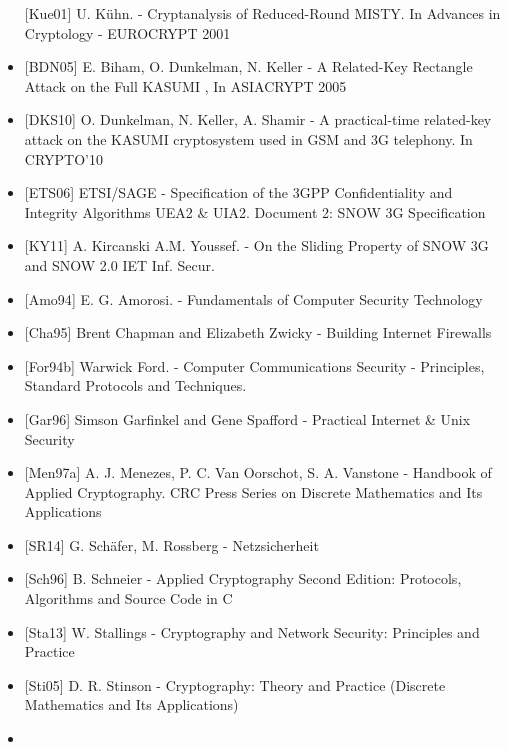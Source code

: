 \documentclass[a4paper]{article}
\begin{document}
\begin{multicols}{3}
\begin{itemize}
              {[}Kue01{]} U. Kühn. - Cryptanalysis of Reduced-Round MISTY. In
              Advances in Cryptology - EUROCRYPT 2001
        \item
              {[}BDN05{]} E. Biham, O. Dunkelman, N. Keller - A Related-Key
              Rectangle Attack on the Full KASUMI , In ASIACRYPT 2005
        \item
              {[}DKS10{]} O. Dunkelman, N. Keller, A. Shamir - A practical-time
              related-key attack on the KASUMI cryptosystem used in GSM and 3G
              telephony. In CRYPTO'10
        \item
              {[}ETS06{]} ETSI/SAGE - Specification of the 3GPP Confidentiality and
              Integrity Algorithms UEA2 \& UIA2. Document 2: SNOW 3G Specification
        \item
              {[}KY11{]} A. Kircanski A.M. Youssef. - On the Sliding Property of
              SNOW 3G and SNOW 2.0 IET Inf. Secur.
        \item
              {[}Amo94{]} E. G. Amorosi. - Fundamentals of Computer Security
              Technology
        \item
              {[}Cha95{]} Brent Chapman and Elizabeth Zwicky - Building Internet
              Firewalls
        \item
              {[}For94b{]} Warwick Ford. - Computer Communications Security -
              Principles, Standard Protocols and Techniques.
        \item
              {[}Gar96{]} Simson Garfinkel and Gene Spafford - Practical Internet \&
              Unix Security
        \item
              {[}Men97a{]} A. J. Menezes, P. C. Van Oorschot, S. A. Vanstone -
              Handbook of Applied Cryptography. CRC Press Series on Discrete
              Mathematics and Its Applications
        \item
              {[}SR14{]} G. Schäfer, M. Rossberg - Netzsicherheit
        \item
              {[}Sch96{]} B. Schneier - Applied Cryptography Second Edition:
              Protocols, Algorithms and Source Code in C
        \item
              {[}Sta13{]} W. Stallings - Cryptography and Network Security:
              Principles and Practice
        \item
              {[}Sti05{]} D. R. Stinson - Cryptography: Theory and Practice
              (Discrete Mathematics and Its Applications)
        \item

\end{itemize}
\end{multicols}
\end{document}
